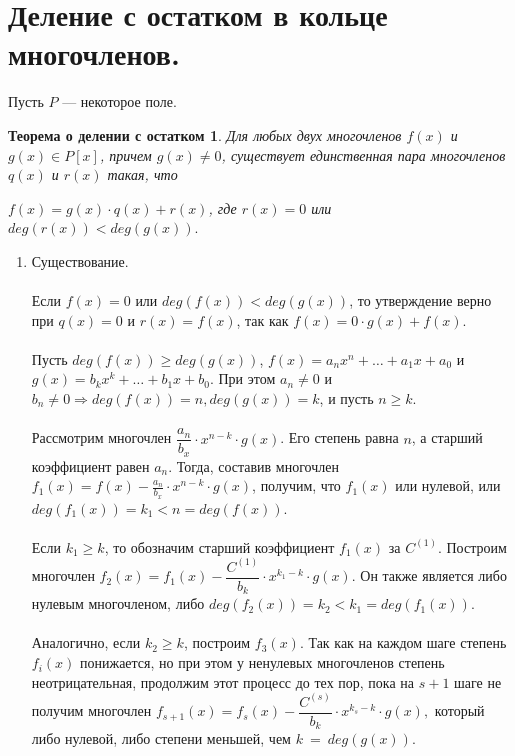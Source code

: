 \section{Деление с остатком в кольце многочленов.}
Пусть $P$ --- некоторое поле.
\newtheorem*{t8_2_1}{Теорема о делении с остатком}\begin{t8_2_1}
	Для любых двух многочленов $f(x)$ и $g(x)\in P[x]$, причем $g(x)\not= 0$, существует единственная пара многочленов $q(x)$ и $r(x)$ такая, что \begin{center}
		$f(x) = g(x)\cdot q(x) + r(x)$, где $r(x) = 0$ или $deg(r(x)) < deg(g(x)).$ 
	\end{center}
\end{t8_2_1}
\begin{Proof}
	\begin{enumerate}
		\item Существование.\\\\
		Если $f(x) = 0$ или $deg(f(x)) < deg(g(x))$, то утверждение верно при $q(x) = 0$ и $r(x) = 
		f(x)$, так как $f(x) = 0\cdot g(x) + f(x)$.\\\\
		Пусть $deg(f(x)) \geqslant deg(g(x))$, $f(x) = a_nx^n + \ldots + a_1x + a_0$ и $g(x) = b_kx^k
		+ \ldots + b_1x + b_0$. При этом $a_n\ne 0$ и $b_n \ne0 \Rightarrow
		deg(f(x)) = n, deg(g(x)) = k$, и пусть $n \geqslant k$.\\\\
		Рассмотрим многочлен $\dfrac{a_n}{b_x}\cdot x^{n-k} \cdot g(x)$. Его степень равна $n$, а старший коэффициент равен $a_n$. Тогда, составив многочлен $f_1(x)=f(x)- \frac{a_n}{b_x}\cdot x^{n-k}\cdot g(x)$, получим, что $f_1(x)$ или нулевой, или $deg(f_1(x))=k_1<n = deg(f(x)).$\\\\
		Если $k_1 \geqslant k$, то обозначим старший коэффициент $f_1(x)$ за $C^{(1)}$. Построим многочлен $f_2(x) = f_1(x) - \dfrac{C^{(1)}}{b_k}\cdot x^{k_1-k}\cdot g(x).$
		Он также является либо нулевым многочленом, либо $deg(f_2(x)) = k_2 < k_1 = deg(f_1(x)).$\\\\
		Аналогично, если $k_2 \geqslant k$, построим $f_3(x)$. Так как на каждом шаге степень $f_i(x)$ понижается, но при этом у ненулевых многочленов степень неотрицательная, продолжим этот процесс до тех пор, пока на $s+1$ шаге не 
		получим многочлен $f_{s+1}(x) = f_s(x) - \dfrac{C^{(s)}}{b_k}\cdot x^{k_s-k}\cdot g(x),$ который либо нулевой, либо степени меньшей, чем $k~=~deg(g(x))$.\\\\

\end{enumerate}
\end{Proof}
